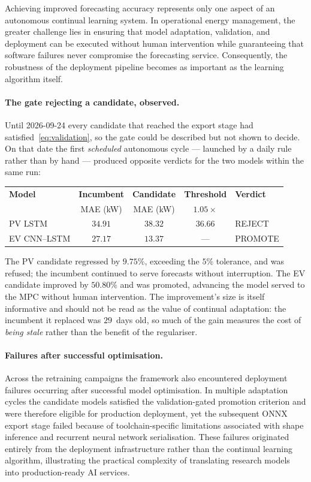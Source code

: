 \documentclass[journal]{IEEEtran}
\begin{document}
Achieving improved forecasting accuracy represents only one aspect of
an autonomous continual learning system. In operational energy
management, the greater challenge lies in ensuring that model
adaptation, validation, and deployment can be executed without human
intervention while guaranteeing that software failures never compromise
the forecasting service. Consequently, the robustness of the deployment
pipeline becomes as important as the learning algorithm itself.

\paragraph{The gate rejecting a candidate, observed.}
Until 2026-09-24 every candidate that reached the export stage had
satisfied~\eqref{eq:validation}, so the gate could be described but not
shown to decide. On that date the first \emph{scheduled} autonomous cycle
--- launched by a daily rule rather than by hand --- produced opposite
verdicts for the two models within the same run:

\begin{center}
\footnotesize
\begin{tabular}{@{}lcccl@{}}
\toprule
\textbf{Model} & \textbf{Incumbent} & \textbf{Candidate} &
\textbf{Threshold} & \textbf{Verdict} \\
& MAE (kW) & MAE (kW) & $1.05\times$ & \\
\midrule
PV LSTM      & $34.91$ & $38.32$ & $36.66$ & REJECT \\
EV CNN--LSTM & $27.17$ & $13.37$ & --- & PROMOTE \\
\bottomrule
\end{tabular}
\end{center}

\noindent The PV candidate regressed by $9.75\%$, exceeding the $5\%$
tolerance, and was refused; the incumbent continued to serve forecasts
without interruption. The EV candidate improved by $50.80\%$ and was
promoted, advancing the model served to the MPC without human
intervention. The improvement's size is itself informative and should not
be read as the value of continual adaptation: the incumbent it replaced
was $29$~days old, so much of the gain measures the cost of \emph{being
stale} rather than the benefit of the regulariser.

\paragraph{Failures after successful optimisation.}
Across the retraining campaigns the framework also encountered deployment
failures occurring after successful model optimisation. In multiple
adaptation cycles the candidate models satisfied the validation-gated
promotion criterion and were therefore eligible for production deployment,
yet the subsequent ONNX export stage failed because of toolchain-specific
limitations associated with shape inference and recurrent neural network
serialisation. These failures originated entirely from the deployment
infrastructure rather than the continual learning algorithm, illustrating
the practical complexity of translating research models into
production-ready AI services.
\end{document}

